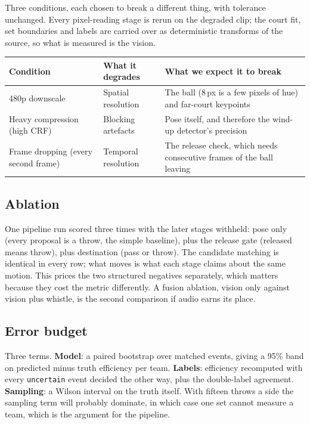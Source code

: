 \documentclass[10pt,a4paper]{article}
\begin{document}
Three conditions, each chosen to break a different thing, with tolerance unchanged. Every
pixel-reading stage is rerun on the degraded clip; the court fit, set boundaries and labels
are carried over as deterministic transforms of the source, so what is measured is the
vision.

{\footnotesize
\begin{xltabular}{\textwidth}{L{22mm} L{38mm} X}
\toprule
\textbf{Condition} & \textbf{What it degrades} & \textbf{What we expect it to break}\\
\midrule
480p downscale & Spatial resolution & The ball (8\,px is a few pixels of hue) and far-court keypoints\\
Heavy compression (high CRF) & Blocking artefacts & Pose itself, and therefore the wind-up detector's precision\\
Frame dropping (every second frame) & Temporal resolution & The release check, which needs consecutive frames of the ball leaving\\
\bottomrule
\end{xltabular}}

\subsection{Ablation}

One pipeline run scored three times with the later stages withheld: pose only (every
proposal is a throw, the simple baseline), plus the release gate (released means throw),
plus destination (pass or throw). The candidate matching is identical in every row; what
moves is what each stage claims about the same motion. This prices the two structured
negatives separately, which matters because they cost the metric differently. A fusion
ablation, vision only against vision plus whistle, is the second comparison if audio earns
its place.

\subsection{Error budget}

Three terms. \textbf{Model}: a paired bootstrap over
matched events, giving a 95\% band on predicted minus truth efficiency per team.
\textbf{Labels}: efficiency recomputed with every \texttt{uncertain} event decided the other
way, plus the double-label agreement. \textbf{Sampling}: a Wilson interval on the truth
itself. With fifteen throws a side the sampling term will probably dominate, in which case
one set cannot measure a team, which is the argument for the pipeline.
\end{document}
